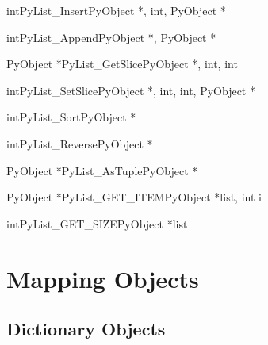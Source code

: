 \documentclass[twoside,openright]{report}
\begin{document}
\begin{cfuncdesc}{int}{PyList_Insert}{PyObject *, int, PyObject *}

\end{cfuncdesc}

\begin{cfuncdesc}{int}{PyList_Append}{PyObject *, PyObject *}

\end{cfuncdesc}

\begin{cfuncdesc}{PyObject *}{PyList_GetSlice}{PyObject *, int, int}

\end{cfuncdesc}

\begin{cfuncdesc}{int}{PyList_SetSlice}{PyObject *, int, int, PyObject *}

\end{cfuncdesc}

\begin{cfuncdesc}{int}{PyList_Sort}{PyObject *}

\end{cfuncdesc}

\begin{cfuncdesc}{int}{PyList_Reverse}{PyObject *}

\end{cfuncdesc}

\begin{cfuncdesc}{PyObject *}{PyList_AsTuple}{PyObject *}

\end{cfuncdesc}

\begin{cfuncdesc}{PyObject *}{PyList_GET_ITEM}{PyObject *list, int i}

\end{cfuncdesc}

\begin{cfuncdesc}{int}{PyList_GET_SIZE}{PyObject *list}

\end{cfuncdesc}


\section{Mapping Objects}

\subsection{Dictionary Objects}
\end{document}
